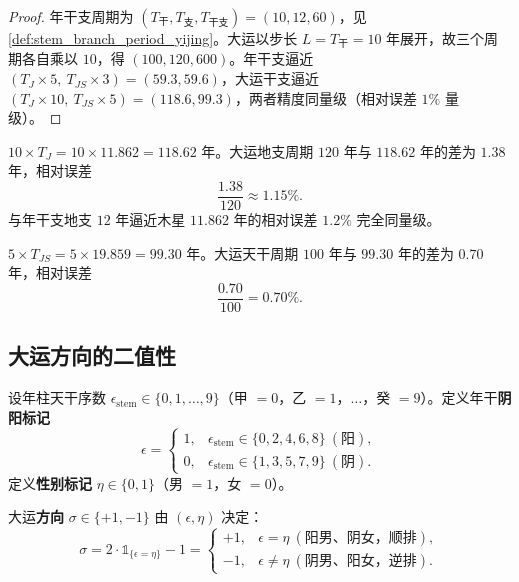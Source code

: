 \begin{proof}
年干支周期为 $(T_{\text{干}},T_{\text{支}},T_{\text{干支}})=(10,12,60)$，见 \cref{def:stem_branch_period_yijing}。大运以步长 $L=T_{\text{干}}=10$ 年展开，故三个周期各自乘以 $10$，得 $(100,120,600)$。年干支逼近 $(T_J\times 5,\ T_{JS}\times 3)=(59.3,59.6)$，大运干支逼近 $(T_J\times 10,\ T_{JS}\times 5)=(118.6,99.3)$，两者精度同量级（相对误差 $1\%$ 量级）。
\end{proof}

\begin{example}\label{ex:dayun_jupiter_120_yijing}
$10\times T_J = 10\times 11.862 = 118.62$ 年。大运地支周期 $120$ 年与 $118.62$ 年的差为 $1.38$ 年，相对误差
\[
\frac{1.38}{120}\approx 1.15\%.
\]
与年干支地支 $12$ 年逼近木星 $11.862$ 年的相对误差 $1.2\%$ 完全同量级。
\end{example}

\begin{example}\label{ex:dayun_js_100_yijing}
$5\times T_{JS}=5\times 19.859=99.30$ 年。大运天干周期 $100$ 年与 $99.30$ 年的差为 $0.70$ 年，相对误差
\[
\frac{0.70}{100}=0.70\%.
\]
\end{example}

\subsection{大运方向的二值性}

\begin{definition}[年干阴阳与性别]\label{def:year_stem_yin_yang_yijing}
设年柱天干序数 $\epsilon_{\text{stem}}\in\{0,1,\dots,9\}$（甲 $=0$，乙 $=1$，$\dots$，癸 $=9$）。定义年干\textbf{阴阳标记}
\[
\epsilon=\begin{cases}1,&\epsilon_{\text{stem}}\in\{0,2,4,6,8\}\ (\text{阳}),\\0,&\epsilon_{\text{stem}}\in\{1,3,5,7,9\}\ (\text{阴}).\end{cases}
\]
定义\textbf{性别标记} $\eta\in\{0,1\}$（男 $=1$，女 $=0$）。
\end{definition}

\begin{definition}[大运方向]\label{def:dayun_direction_yijing}
大运\textbf{方向} $\sigma\in\{+1,-1\}$ 由 $(\epsilon,\eta)$ 决定：
\[
\sigma=2\cdot\mathbb 1_{\{\epsilon=\eta\}}-1=
\begin{cases}+1,&\epsilon=\eta\ (\text{阳男、阴女，顺排}),\\-1,&\epsilon\neq\eta\ (\text{阴男、阳女，逆排}).\end{cases}
\]
\end{definition}

